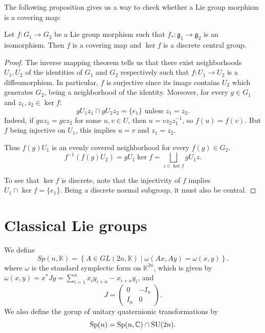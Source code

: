 \documentclass{report}
\begin{document}
The following proposition gives us a way to check whether a Lie group morphism is a covering map:
\begin{proposition}\label{prop:covering_map_criterion}
    Let $f:G_1 \to G_2$ be a Lie group morphism such that $f_*: \mathfrak g_1 \to \mathfrak g_2$ is an isomorphism.
    Then $f$ is a covering map and $\ker f$ is a discrete central group.
\end{proposition}
\begin{proof}
    The inverse mapping theorem tells us that there exist neighborhoods $U_1, U_2$ of the identities of $G_1$ and $G_2$ respectively such that $f:U_1 \to U_2$ is a diffeomorphism.
    In particular, $f$ is surjective since its image contains $U_2$ which generates $G_2$, being a neighborhood of the identity.
    Moreover, for every $g \in G_1$ and $z_1, z_2 \in \ker f$:
    \[
        gU_1 z_1 \cap gU_2 z_2 = \{e_1\} \text{ unless } z_1 = z_2.
    \]
    Indeed, if $g u z_1 = g v z_2$ for some $u, v \in U$, then $u = v z_2 z_1^{-1}$, so $f(u) = f(v)$.
    But $f$ being injective on $U_1$, this implies $u = v$ and $z_1 = z_2$.

    Thus $f(g)U_1$ is an evenly covered neighborhood for every $f(g) \in G_2$.
    \[
    f^{-1}(f(g)U_2) = g U_1 \ker f = \bigsqcup_{z \in \ker f} g U_1 z.
    \]

    To see that $\ker f$ is discrete, note that the injectivity of $f$ implies $U_1 \cap \ker f = \{ e_1 \}$.
    Being a discrete normal subgroup, it must also be central.
\end{proof}

\section{Classical Lie groups}

\begin{definition}
    We define
    \[
    Sp(n, \mathbb K) = 
    \left\{
        A \in GL(2n, \mathbb K) \mid \omega(Ax, Ay) = \omega(x, y)
    \right\}.
    \]
    where $\omega$ is the standard symplectic form on $\mathbb K^{2n}$, which is given by
    $\omega(x, y) = x^* J y = \sum_{i=1}^n x_i y_{i+n} - x_{i+n}y_i$, 
    and 
    \[
    J = 
    \begin{pmatrix}
    0 & -I_n \\
    I_n & 0
    \end{pmatrix}.
    \]
    We also define the gorup of unitary quaternionic transformations by
    \[
    \operatorname{{\mathrm{Sp}}}(n) = \operatorname{{\mathrm{Sp}}}(n, \mathbb C) \cap \operatorname{{\mathrm{SU}}}(2n).
    \]
\end{definition}
\end{document}

